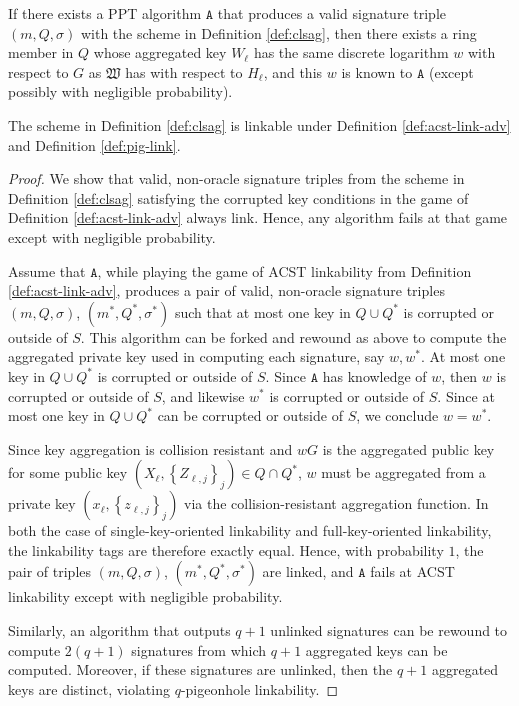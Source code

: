 \documentclass{llncs}
\begin{document}
\begin{theorem}\label{cor:no-aliens}
If there exists a PPT algorithm $\texttt{A}$  that produces a valid signature triple $(m, Q, \sigma)$ with the scheme in Definition \ref{def:clsag}, then there exists a ring member in $Q$ whose aggregated key $W_\ell$ has the same discrete logarithm $w$ with respect to $G$ as $\mathfrak{W}$ has with respect to $H_\ell$, and this $w$ is known to $\texttt{A}$ (except possibly with negligible probability).
\end{theorem}

\begin{theorem}\label{thm:linkabilty}
The scheme in Definition \ref{def:clsag} is linkable under Definition \ref{def:acst-link-adv} and Definition \ref{def:pig-link}.
\end{theorem}

\begin{proof}
We show that valid, non-oracle signature triples from the scheme in Definition \ref{def:clsag} satisfying the corrupted key conditions in the game of Definition \ref{def:acst-link-adv} always link. Hence, any algorithm fails at that game except with negligible probability.

Assume that $\texttt{A}$,  while playing the game of ACST linkability from Definition \ref{def:acst-link-adv}, produces a pair of valid, non-oracle signature triples $(m, Q, \sigma)$, $(m^*, Q^*, \sigma^*)$ such that at most one key in $Q \cup Q^*$ is corrupted or outside of $S$. This algorithm can be forked and rewound as above to compute the aggregated private key used in computing each signature, say $w, w^*$. At most one key in $Q \cup Q^*$ is corrupted or outside of $S$. Since $\texttt{A}$ has knowledge of $w$, then $w$ is corrupted or outside of $S$, and likewise $w^*$ is corrupted or outside of $S$. Since at most one key in $Q \cup Q^*$ can be corrupted or outside of $S$, we conclude $w = w^*$.

Since key aggregation is collision resistant and $wG$ is the aggregated public key for some public key $(X_\ell, \left\{Z_{\ell, j}\right\}_j) \in Q \cap Q^*$, $w$ must be aggregated from a private key $(x_\ell, \left\{z_{\ell, j}\right\}_j)$ via the collision-resistant aggregation function. In both the case of single-key-oriented linkability and full-key-oriented linkability, the linkability tags are therefore exactly equal. Hence, with probability $1$, the pair of triples $(m, Q, \sigma)$, $(m^*, Q^*, \sigma^*)$ are linked, and $\texttt{A}$ fails at ACST linkability except with negligible probability.

Similarly, an algorithm that outputs $q+1$ unlinked signatures can be rewound to compute $2(q+1)$ signatures from which $q+1$ aggregated keys can be computed. Moreover, if these signatures are unlinked, then the $q+1$ aggregated keys are distinct, violating $q$-pigeonhole linkability.
\end{proof}
\end{document}
